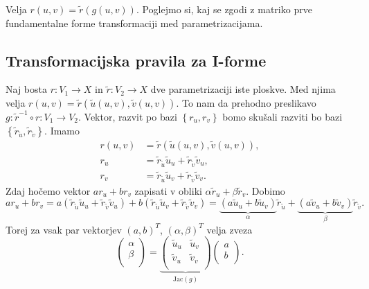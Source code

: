 Velja $r(u,v) = \tilde{r}(g(u,v))$. Poglejmo si, kaj se zgodi z matriko prve fundamentalne forme transformaciji med parametrizacijama.


\subsection{Transformacijska pravila za I-forme}

Naj bosta $r: V_1 \to  X$ in $\tilde{r}: V_2 \to  X$ dve parametrizaciji iste ploskve. Med njima velja $r(u,v) = \tilde{r}(\tilde{u}(u,v), \tilde{v}(u,v))$.
To nam da prehodno preslikavo $g: \tilde{r}^{-1} \circ  r : V_1 \to  V_2$. Vektor, razvit po bazi $\left\{ r_u, r_v \right\}$ bomo skušali
razviti bo bazi $\left\{ \tilde{r}_{\tilde{u}}, \tilde{r}_{\tilde{v}} \right\}$. Imamo 
\begin{align*}
  r(u,v) &= \tilde{r}(\tilde{u}(u,v), \tilde{v}(u,v)), \\
  r_u   &= \tilde{r}_{\tilde{u}} \tilde{u}_u + \tilde{r}_{\tilde{v}} \tilde{v}_u, \\ 
  r_v &= \tilde{r}_{\tilde{u}} \tilde{u}_v + \tilde{r}_{\tilde{v}} \tilde{v}_v.
\end{align*}
Zdaj hočemo vektor $a r_u + b r_v$ zapisati v obliki $\alpha \tilde{r}_u + \beta \tilde{r}_v$. Dobimo 
\begin{equation*} a r_u + b r_v  = a(\tilde{r}_{\tilde{u}} \tilde{u}_u + \tilde{r}_{\tilde{v}} \tilde{v}_u) + b (\tilde{r}_{\tilde{u}} \tilde{u}_v + \tilde{r}_{\tilde{v}} \tilde{v}_v) 
= \underbrace{(a \tilde{u}_u + b \tilde{u}_v)}_{\alpha} \tilde{r}_{\tilde{u}} + \underbrace{(a \tilde{v}_u + b \tilde{v}_v)}_{\beta} \tilde{r}_{\tilde{v}}. \end{equation*}
Torej za vsak par vektorjev $(a, b)^{T}$, $(\alpha, \beta)^{T}$ velja zveza 
\begin{equation*} \begin{pmatrix}
  \alpha\\
  \beta\\
\end{pmatrix} = 
\underbrace{\begin{pmatrix}
  \tilde{u}_u & \tilde{u}_v\\
  \tilde{v}_u & \tilde{v}_v \\
\end{pmatrix}}_{\text{Jac}(g)}  
\begin{pmatrix}
  a\\
  b\\
\end{pmatrix}. \end{equation*}

